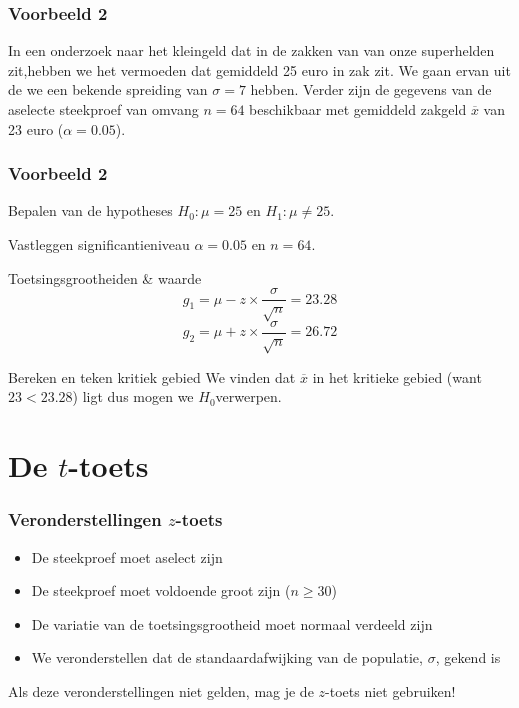 \documentclass{beamer}
\begin{document}
\begin{frame}
  \frametitle{Voorbeeld 2}
  In een onderzoek naar het kleingeld dat in de zakken van  van  onze superhelden zit,hebben we het vermoeden dat gemiddeld 25 euro in zak zit. We gaan ervan uit de we een bekende spreiding van $\sigma = 7$ hebben. Verder zijn de gegevens van de aselecte steekproef van omvang $n=64$ beschikbaar met gemiddeld zakgeld $\overline{x}$ van 23 euro  ($\alpha = 0.05$).
\end{frame}

\begin{frame}
  \frametitle{Voorbeeld 2}
  \begin{block}{Bepalen van de hypotheses}
  $H_{0} : \mu = 25$ en $H_{1}: \mu \neq 25$.
  \end{block}

  \begin{block}{Vastleggen significantieniveau}
  $\alpha = 0.05$ en $n=64$.
  \end{block}

  \begin{block}{Toetsingsgrootheiden \& waarde}
    \[ g_{1} = \mu - z \times \frac{\sigma}{\sqrt{n}} = 23.28 \]
    \[ g_{2} = \mu + z \times \frac{\sigma}{\sqrt{n}} = 26.72 \]
    \end{block}

    \begin{block}{Bereken en teken kritiek gebied}
      We vinden dat $\overline{x}$ in het kritieke gebied (want $23 < 23.28$) ligt dus mogen we $H_{0}$verwerpen.
  \end{block}
\end{frame}

\section{De $t$-toets}
\sectionframelogo{}

\begin{frame}
  \frametitle{Veronderstellingen $z$-toets}
  
  
  \begin{itemize}
    \item De steekproef moet aselect zijn
    \item De steekproef moet voldoende groot zijn ($n \ge 30$)
    \item De variatie van de toetsingsgrootheid moet normaal verdeeld zijn
    \item We veronderstellen dat de standaardafwijking van de populatie, $\sigma$, gekend is
  \end{itemize}

  Als deze veronderstellingen niet gelden, mag je de $z$-toets niet gebruiken!
\end{frame}
\end{document}
